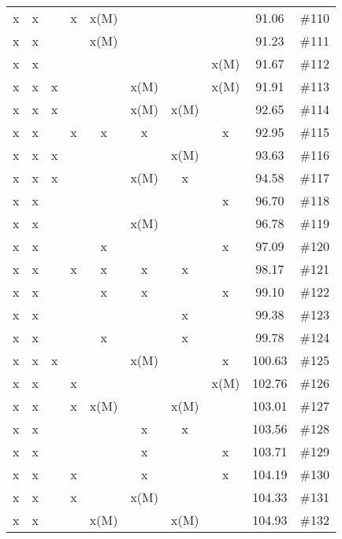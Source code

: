 \begin{longtable}{|c|c|c|c|c|c|c|c|c|c|}
 x    & x    &      & x    & x(M) &      &      &      & 91.06 & \#110 \\
 x    & x    &      &      & x(M) &      &      &      & 91.23 & \#111 \\
 x    & x    &      &      &      &      &      & x(M) & 91.67 & \#112 \\
 x    & x    & x    &      &      & x(M) &      & x(M) & 91.91 & \#113 \\
 x    & x    & x    &      &      & x(M) & x(M) &      & 92.65 & \#114 \\
 x    & x    &      & x    & x    & x    &      & x    & 92.95 & \#115 \\
 x    & x    & x    &      &      &      & x(M) &      & 93.63 & \#116 \\
 x    & x    & x    &      &      & x(M) & x    &      & 94.58 & \#117 \\
 x    & x    &      &      &      &      &      & x    & 96.70 & \#118 \\
 x    & x    &      &      &      & x(M) &      &      & 96.78 & \#119 \\
 x    & x    &      &      & x    &      &      & x    & 97.09 & \#120 \\
 x    & x    &      & x    & x    & x    & x    &      & 98.17 & \#121 \\
 x    & x    &      &      & x    & x    &      & x    & 99.10 & \#122 \\
 x    & x    &      &      &      &      & x    &      & 99.38 & \#123 \\
 x    & x    &      &      & x    &      & x    &      & 99.78 & \#124 \\
 x    & x    & x    &      &      & x(M) &      & x    & 100.63 & \#125 \\
 x    & x    &      & x    &      &      &      & x(M) & 102.76 & \#126 \\
 x    & x    &      & x    & x(M) &      & x(M) &      & 103.01 & \#127 \\
 x    & x    &      &      &      & x    & x    &      & 103.56 & \#128 \\
 x    & x    &      &      &      & x    &      & x    & 103.71 & \#129 \\
 x    & x    &      & x    &      & x    &      & x    & 104.19 & \#130 \\
 x    & x    &      & x    &      & x(M) &      &      & 104.33 & \#131 \\
 x    & x    &      &      & x(M) &      & x(M) &      & 104.93 & \#132 \\

\end{longtable}
